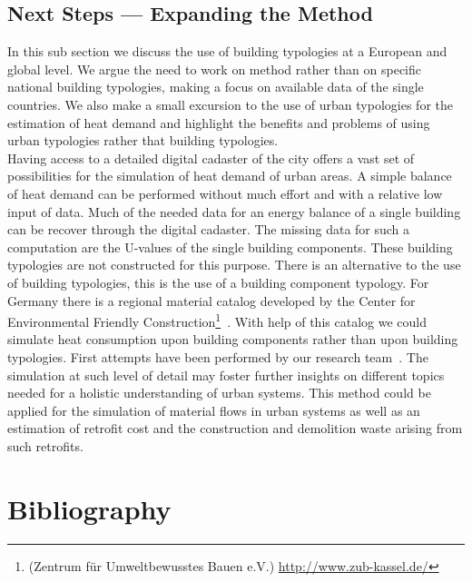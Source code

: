 \documentclass[authoryear,preprint,review,12pt]{elsarticle}
\begin{document}
\begin{linenumbers}
\subsection{Next Steps --- Expanding the Method}\label{sub-section:next}

In this sub section we discuss the use of building typologies at a European
and global level. We argue the need to work on method rather than on specific
national building typologies, making a focus on available data of the single
countries.  We also make a small excursion to the use of urban typologies for
the estimation of heat demand and highlight the benefits and problems of using
urban typologies rather that building typologies.\\

Having access to a detailed digital cadaster of the city offers a vast set of
possibilities for the simulation of heat demand of urban areas.  A simple
balance of heat demand can be performed without much effort and with a relative
low input of data.  Much of the needed data for an energy balance of a single
building can be recover through the digital cadaster.  The missing data for
such a computation are the U-values of the single building components.  These
building typologies are not constructed for this purpose.  There is an
alternative to the use of building typologies, this is the use of a building
component typology.  For Germany there is a regional material catalog developed
by the Center for Environmental Friendly Construction\footnote{(Zentrum für
    Umweltbewusstes Bauen e.V.)
    \url{http://www.zub-kassel.de/}}~\cite{Klauss.2009}.
With help of this catalog we could simulate heat consumption upon building
components rather than upon building typologies.  First attempts have been
performed by our research team~\cite{Munoz.2014c}. The simulation at such level of
detail may foster further insights on different topics needed for a holistic
understanding of urban systems.  This method could be applied for the
simulation of material flows in urban systems as well as an estimation of
retrofit cost and the construction and demolition waste arising from such
retrofits.\\


\section*{Bibliography}
 


%

\end{linenumbers}
\end{document}
